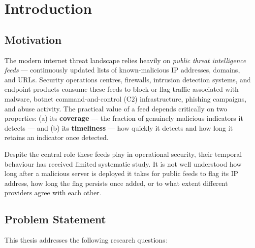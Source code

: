 \documentclass[12pt, a4paper, twoside]{report}
\begin{document}
\listoffigures
{}
\cleardoublepage

\listoftables
{}
\cleardoublepage

\glsaddall
\printglossary[type=\acronymtype, title={List of Abbreviations}, nonumberlist]
\cleardoublepage


\chapter{Introduction}
\label{ch:introduction}

\section{Motivation}

The modern internet threat landscape relies heavily on \emph{public threat intelligence feeds} ---
continuously updated lists of known-malicious IP addresses, domains, and URLs. Security operations
centres, firewalls, intrusion detection systems, and endpoint products consume these feeds to block
or flag traffic associated with malware, botnet command-and-control (C2) infrastructure, phishing
campaigns, and abuse activity. The practical value of a feed depends critically on two properties:
(a) its \textbf{coverage} --- the fraction of genuinely malicious indicators it detects --- and
(b) its \textbf{timeliness} --- how quickly it detects and how long it retains an indicator once
detected.

Despite the central role these feeds play in operational security, their temporal behaviour has
received limited systematic study. It is not well understood how long after a malicious server is
deployed it takes for public feeds to flag its IP address, how long the flag persists once added,
or to what extent different providers agree with each other.

\section{Problem Statement}

This thesis addresses the following research questions:
\end{document}
